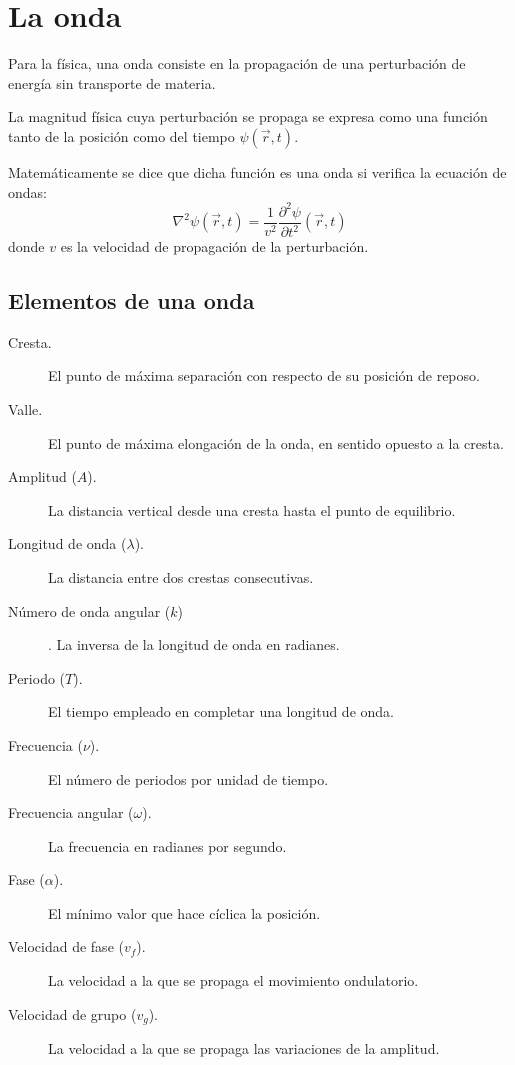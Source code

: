 \section{La onda}\label{sec:la-onda}

Para la física, una onda consiste en la propagación de una perturbación de energía sin transporte de materia.

La magnitud física cuya perturbación se propaga se expresa como una función tanto de la posición como del tiempo
$\psi(\vec{r},t)$.

Matemáticamente se dice que dicha función es una onda si verifica la ecuación de ondas:
\begin{equation}\label{eq:ecuacion-onda}
\nabla^2\psi(\vec {r},t)=\frac {1}{v^2}\frac{\partial^2\psi}{\partial t^2}(\vec {r},t)
\end{equation}
donde $v$ es la velocidad de propagación de la perturbación.

\subsection{Elementos de una onda}\label{subsec:elementos-de-una-onda}

\begin{description}
    \item[Cresta.] El punto de máxima separación con respecto de su posición de reposo.
    \item[Valle.] El punto de máxima elongación de la onda, en sentido opuesto a la cresta.
    \item[Amplitud ($A$).] La distancia vertical desde una cresta hasta el punto de equilibrio.
    \item[Longitud de onda ($\lambda$).] La distancia entre dos crestas consecutivas.
    \item[Número de onda angular ($k$)]. La inversa de la longitud de onda en radianes.
    \item[Periodo ($T$).] El tiempo empleado en completar una longitud de onda.
    \item[Frecuencia ($\nu$).] El número de periodos por unidad de tiempo.
    \item[Frecuencia angular ($\omega$).] La frecuencia en radianes por segundo.
    \item[Fase ($\alpha$).] El mínimo valor que hace cíclica la posición.
    \item[Velocidad de fase ($v_f$).] La velocidad a la que se propaga el movimiento ondulatorio.
    \item[Velocidad de grupo ($v_g$).] La velocidad a la que se propaga las variaciones de la amplitud.
\end{description}

